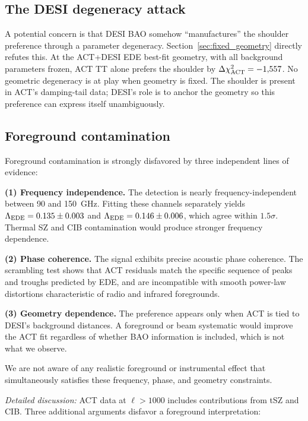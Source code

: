 \documentclass[twocolumn,showpacs,preprintnumbers,amsmath,amssymb,prd]{revtex4-2}
\begin{document}
\subsection{The DESI degeneracy attack}

A potential concern is that DESI BAO somehow ``manufactures'' the shoulder 
preference through a parameter degeneracy. Section~\ref{sec:fixed_geometry} 
directly refutes this. At the ACT+DESI EDE best-fit geometry, with all 
background parameters frozen, ACT TT alone prefers the shoulder by 
$\Delta\chi^2_{\rm ACT} = -1{,}557$. No geometric degeneracy is at play 
when geometry is fixed. The shoulder is present in ACT's damping-tail 
data; DESI's role is to anchor the geometry so this preference can 
express itself unambiguously.

\subsection{Foreground contamination}

Foreground contamination is strongly disfavored by three independent 
lines of evidence:

\textbf{(1) Frequency independence.} The detection is nearly 
frequency-independent between 90 and 150~GHz. Fitting these channels 
separately yields $\Lambda_{\rm EDE} = 0.135 \pm 0.003$ and 
$\Lambda_{\rm EDE} = 0.146 \pm 0.006$, which agree within $1.5\sigma$. 
Thermal SZ and CIB contamination would produce stronger frequency dependence.

\textbf{(2) Phase coherence.} The signal exhibits precise acoustic 
phase coherence. The scrambling test shows that ACT 
residuals match the specific sequence of peaks and troughs predicted 
by EDE, and are incompatible with smooth power-law distortions 
characteristic of radio and infrared foregrounds.

\textbf{(3) Geometry dependence.} The preference appears only when 
ACT is tied to DESI's background distances. A foreground or beam 
systematic would improve the ACT fit regardless of whether BAO 
information is included, which is not what we observe.

We are not aware of any realistic foreground or instrumental effect 
that simultaneously satisfies these frequency, phase, and geometry 
constraints.

\vspace{0.5em}
\noindent\textit{Detailed discussion:} ACT data at $\ell > 1000$ 
includes contributions from tSZ and CIB. Three additional arguments 
disfavor a foreground interpretation:
\end{document}

